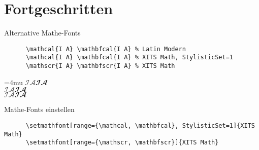 \section{Fortgeschritten}





\begin{frame}[fragile]{Alternative Mathe-Fonts}
  \begin{CodeExample}{0.83}
    \begin{lstlisting}
      \mathcal{I A} \mathbfcal{I A} % Latin Modern
      \mathcal{I A} \mathbfcal{I A} % XITS Math, StylisticSet=1
      \mathscr{I A} \mathbfscr{I A} % XITS Math
    \end{lstlisting}
  \CodeResult
    \Umathordordspacing\textstyle=4mu
    $\mathcal{I A} \mathbfcal{I A}$ \\
    { $\mathcal{I A} \mathbfcal{I A}$} \\
    $\mathscr{I A} \mathbfscr{I A}$
  \end{CodeExample}

  \begin{tblock}{Mathe-Fonts einstellen}
    \begin{lstlisting}
      \setmathfont[range={\mathcal, \mathbfcal}, StylisticSet=1]{XITS Math}
      \setmathfont[range={\mathscr, \mathbfscr}]{XITS Math}
    \end{lstlisting}
  \end{tblock}
\end{frame}
